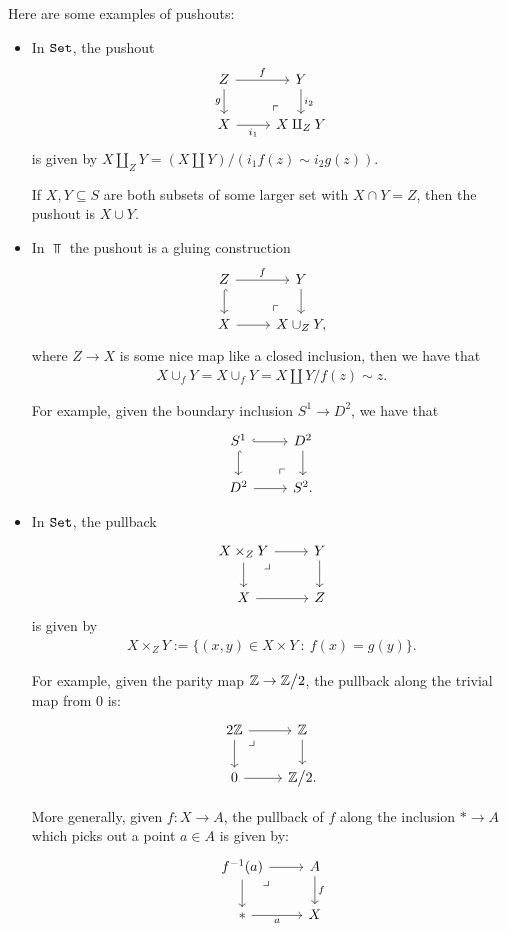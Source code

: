 \documentclass{article}[11pt]
\begin{document}
\begin{examples} Here are some examples of pushouts:
\begin{itemize}\itemsep0em
    \item In $\texttt{Set}$, the pushout
	\[
		\begin{tikzcd}
			Z\dar["g" left]\rar["f" above] & Y\dar["i_2" right] \\
			X\rar["i_1" below] & X\amalg_Z Y \po
		\end{tikzcd}
	\]
	is given by $X\amalg_Z Y = (X\amalg Y)\Big/(i_1 f(z) \sim i_2 g(z))$.

	If $X,Y\subseteq S$ are both subsets of some larger set with $X\cap Y = Z$, then the pushout is $X\cup Y$.
	\item In $\Top$ the pushout is a gluing construction
	\[
		\begin{tikzcd}
		Z\dar[hook]\rar["f"] & Y\dar \\
		X\rar & X\cup_Z Y\po,
		\end{tikzcd}
	\]
	where $Z\to X$ is some nice map like a closed inclusion, then we have that
	\begin{align*}
		X\cup_f Y = X\cup_f Y = X\amalg Y \Big/ f(z) \sim z.
	\end{align*}

	For example, given the boundary inclusion $S^1 \to D^2$, we have that
	\[
		\begin{tikzcd}
		S^1\dar[hook]\rar[hook] & D^2\dar \\
		D^2\rar & S^2. \po
		\end{tikzcd}
	\]

	\item In $\texttt{Set}$, the pullback
	\[
		\begin{tikzcd}
		X\times_Z Y\rar\dar\pb & Y\dar \\
		X\rar & Z
		\end{tikzcd}
	\]
	is given by
	\begin{align*}
		X\times_Z Y := \{(x,y)\in X\times Y \ : \ f(x) = g(y)\}.
	\end{align*}

	For example, given the parity map $\mathbb{Z}\to \mathbb{Z}\big/2$, the pullback along the trivial map from 0 is:
	\[
		\begin{tikzcd}
		2\Z\rar\dar\pb & \Z\dar \\
		0\rar & \Z\big/2.
		\end{tikzcd}
	\]

	More generally, given $f: X\to A$, the pullback of $f$ along the inclusion $\ast \to A$ which picks out a point $a\in A$ is given by:
	\[
		\begin{tikzcd}
		f^{-1}(a) \rar\dar\pb & A\dar["f" right] \\
		\ast\rar["a" below] & X
		\end{tikzcd}
	\]
\end{itemize}
\end{examples}
\end{document}
